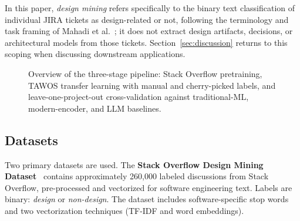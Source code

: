 \documentclass[preprint,12pt]{elsarticle}
\begin{document}
In this paper, \emph{design mining} refers specifically to the binary text classification of individual JIRA tickets as design-related or not, following the terminology and task framing of Mahadi et al.~\cite{mahadi2021}; it does not extract design artifacts, decisions, or architectural models from those tickets. Section~\ref{sec:discussion} returns to this scoping when discussing downstream applications.

\begin{figure}[t]
\centering
{}
\caption{Overview of the three-stage pipeline: Stack Overflow pretraining, TAWOS transfer learning with manual and cherry-picked labels, and leave-one-project-out cross-validation against traditional-ML, modern-encoder, and LLM baselines.}
\label{fig:pipeline}
\end{figure}

\subsection{Datasets}

Two primary datasets are used. The \textbf{Stack Overflow Design Mining Dataset}~\cite{mahadi2021} contains approximately 260,000 labeled discussions from Stack Overflow, pre-processed and vectorized for software engineering text. Labels are binary: \emph{design} or \emph{non-design}. The dataset includes software-specific stop words and two vectorization techniques (TF-IDF and word embeddings).
\end{document}
